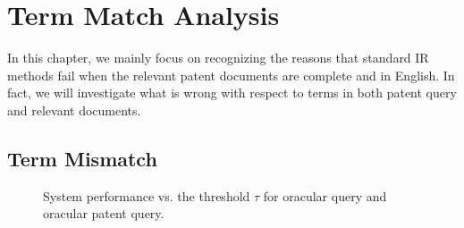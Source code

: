 \chapter{Term Match Analysis}
\label{cha:analysis}
In this chapter, we mainly focus on recognizing the reasons that standard IR methods fail when the relevant patent documents are complete and in English. In fact, we will investigate what is wrong with respect to terms in both patent query and relevant documents. 
\section{Term Mismatch}
\label{sec:termmismatch}
%
\begin{figure}[t!]

\begin{centering}
\par\end{centering}

\protect\caption{System performance vs. the threshold $\tau$ for oracular query and oracular patent query.}
\label{fig:oracular}
\end{figure}

